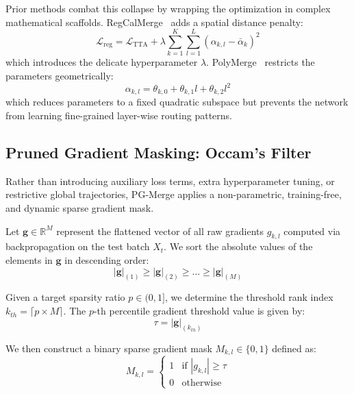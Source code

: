 Prior methods combat this collapse by wrapping the optimization in complex mathematical scaffolds. RegCalMerge~\cite{regcalmerge} adds a spatial distance penalty:
\begin{equation}
    \mathcal{L}_{\text{reg}} = \mathcal{L}_{\text{TTA}} + \lambda \sum_{k=1}^K \sum_{l=1}^L (\alpha_{k, l} - \bar{\alpha}_k)^2
\end{equation}
which introduces the delicate hyperparameter $\lambda$. PolyMerge~\cite{polymerge} restricts the parameters geometrically:
\begin{equation}
    \alpha_{k, l} = \theta_{k, 0} + \theta_{k, 1} l + \theta_{k, 2} l^2
\end{equation}
which reduces parameters to a fixed quadratic subspace but prevents the network from learning fine-grained layer-wise routing patterns.

\subsection{Pruned Gradient Masking: Occam's Filter}
Rather than introducing auxiliary loss terms, extra hyperparameter tuning, or restrictive global trajectories, PG-Merge applies a non-parametric, training-free, and dynamic sparse gradient mask. 

Let $\mathbf{g} \in \mathbb{R}^M$ represent the flattened vector of all raw gradients $g_{k, l}$ computed via backpropagation on the test batch $X_t$. We sort the absolute values of the elements in $\mathbf{g}$ in descending order:
\begin{equation}
    |\mathbf{g}|_{(1)} \ge |\mathbf{g}|_{(2)} \ge \dots \ge |\mathbf{g}|_{(M)}
\end{equation}

Given a target sparsity ratio $p \in (0, 1]$, we determine the threshold rank index $k_{th} = \lceil p \times M \rceil$. The $p$-th percentile gradient threshold value is given by:
\begin{equation}
    \tau = |\mathbf{g}|_{(k_{th})}
\end{equation}

We then construct a binary sparse gradient mask $M_{k, l} \in \{0, 1\}$ defined as:
\begin{equation}
    M_{k, l} = \begin{cases}
        1 & \text{if } |g_{k, l}| \ge \tau \\
        0 & \text{otherwise}
    \end{cases}
    \label{eq:mask}
\end{equation}

